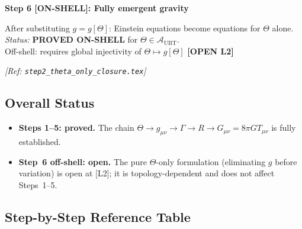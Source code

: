 \documentclass[12pt]{article}
\theoremstyle{definition}
\theoremstyle{remark}
\begin{document}
\begin{tcolorbox}[colback=blue!5!white,colframe=blue!75!black,
  title=Theorem (GR Recovery Chain)]
\medskip
\textbf{Step 6 [ON-SHELL]: Fully emergent gravity}

After substituting $g = g[\Theta]$: Einstein equations become equations for
$\Theta$ alone. \\
\textit{Status:} \textbf{PROVED ON-SHELL} for $\Theta \in \mathcal{A}_\mathrm{UBT}$. \\
Off-shell: requires global injectivity of $\Theta \mapsto g[\Theta]$
\hfill\textbf{[OPEN L2]}

\hfill\textit{[Ref: \texttt{step2\_theta\_only\_closure.tex}]}

\end{tcolorbox}

\subsection{Overall Status}

\begin{tcolorbox}[colback=green!5!white,colframe=green!75!black,
  title=GR Recovery Status: SUBSTANTIALLY PROVED {[L1]}]

\begin{itemize}
  \item \textbf{Steps 1--5: proved.}
        The chain $\Theta \to g_{\mu\nu} \to \Gamma \to R \to G_{\mu\nu} = 8\pi G T_{\mu\nu}$
        is fully established.
  \item \textbf{Step~6 off-shell: open.}
        The pure $\Theta$-only formulation (eliminating $g$ before variation) is
        open at [L2]; it is topology-dependent and does not affect Steps~1--5.
\end{itemize}

\end{tcolorbox}

\subsection{Step-by-Step Reference Table}
\end{document}
